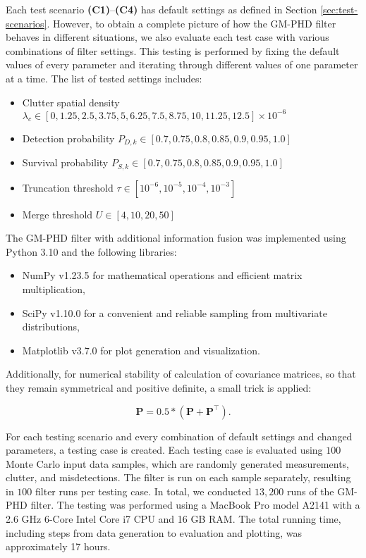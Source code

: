 Each test scenario \textbf{(C1)}--\textbf{(C4)} has default settings as defined in Section \ref{sec:test-scenarios}. However, to obtain a complete picture of how the GM-PHD filter behaves in different situations, we also evaluate each test case with various combinations of filter settings. This testing is performed by fixing the default values of every parameter and iterating through different values of one parameter at a time. The list of tested settings includes:

\begin{itemize}
    \item Clutter spatial density $\lambda_c \in [0, 1.25, 2.5, 3.75, 5, 6.25, 7.5, 8.75, 10, 11.25, 12.5] \times 10^{-6}$
    \item Detection probability $P_{D,k} \in [0.7, 0.75, 0.8, 0.85, 0.9, 0.95, 1.0]$
    \item Survival probability $P_{S,k} \in [0.7, 0.75, 0.8, 0.85, 0.9, 0.95, 1.0]$
    \item Truncation threshold $\tau \in [10^{-6}, 10^{-5}, 10^{-4}, 10^{-3}]$
    \item Merge threshold $U \in [4, 10, 20, 50]$
\end{itemize}

The GM-PHD filter with additional information fusion was implemented using Python 3.10 and the following libraries:

\begin{itemize}
    \item NumPy v1.23.5 for mathematical operations and efficient matrix multiplication,
    \item SciPy v1.10.0 for a convenient and reliable sampling from multivariate distributions,
    \item Matplotlib v3.7.0 for plot generation and visualization.
\end{itemize}

Additionally, for numerical stability of calculation of covariance matrices, so that they remain symmetrical and positive definite, a small trick is applied:

\begin{equation}
    \mathbf{P} = 0.5 * (\mathbf{P} + \mathbf{P}^\intercal).
\end{equation}

For each testing scenario and every combination of default settings and changed parameters, a testing case is created. Each testing case is evaluated using $100$ Monte Carlo input data samples, which are randomly generated measurements, clutter, and misdetections. The filter is run on each sample separately, resulting in $100$ filter runs per testing case. In total, we conducted $13,200$ runs of the GM-PHD filter. The testing was performed using a MacBook Pro model A2141 with a 2.6 GHz 6-Core Intel Core i7 CPU and 16 GB RAM. The total running time, including steps from data generation to evaluation and plotting, was approximately 17 hours.
